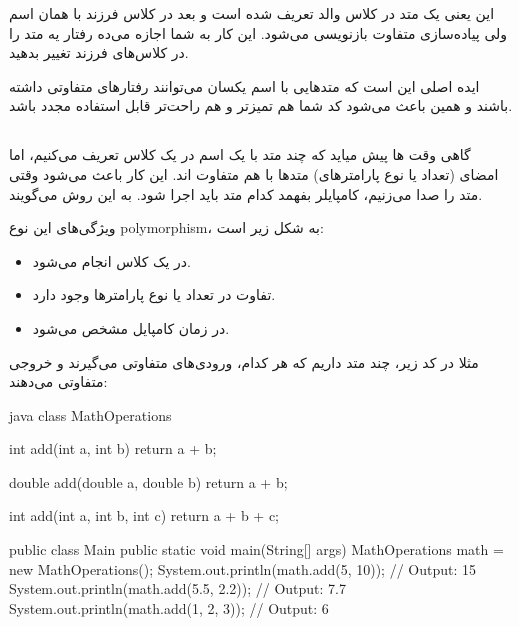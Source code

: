 این یعنی یک متد در کلاس والد تعریف شده است و بعد در کلاس فرزند با همان
اسم ولی پیاده‌سازی متفاوت بازنویسی می‌شود. این کار به شما اجازه می‌ده رفتار
یه متد را در کلاس‌های فرزند تغییر بدهید.

ایده اصلی این است که متدهایی با اسم یکسان می‌توانند رفتارهای متفاوتی
داشته باشند و همین باعث می‌شود کد شما هم تمیزتر و هم راحت‌تر قابل استفاده
مجدد باشد.

\subsection{}

گاهی وقت ها پیش میاید که چند متد با یک اسم در یک کلاس تعریف می‌کنیم، اما
امضای (تعداد یا نوع پارامترهای) متدها با هم متفاوت اند. این کار باعث
می‌شود وقتی متد را صدا می‌زنیم، کامپایلر بفهمد کدام متد باید اجرا شود. به
این روش  می‌گویند.

ویژگی‌های این نوع polymorphism، به شکل زیر است:

\begin{itemize}
\tightlist
\item
  در یک کلاس انجام می‌شود.
\item
  تفاوت در تعداد یا نوع پارامترها وجود دارد.
\item
  در زمان کامپایل مشخص می‌شود.
\end{itemize}

مثلا در کد زیر، چند متد  داریم که هر کدام، ورودی‌های
متفاوتی می‌گیرند و خروجی متفاوتی می‌دهند:

\begin{codebox}{java}
class MathOperations {  
    int add(int a, int b) {  
        return a + b;  
    }  

    double add(double a, double b) {  
        return a + b;  
    }  

    int add(int a, int b, int c) {  
        return a + b + c;  
    }  
}

public class Main {  
    public static void main(String[] args) {  
        MathOperations math = new MathOperations();  
        System.out.println(math.add(5, 10)); // Output: 15  
        System.out.println(math.add(5.5, 2.2)); // Output: 7.7  
        System.out.println(math.add(1, 2, 3)); // Output: 6  
    }
}
\end{codebox}

\subsection{}

